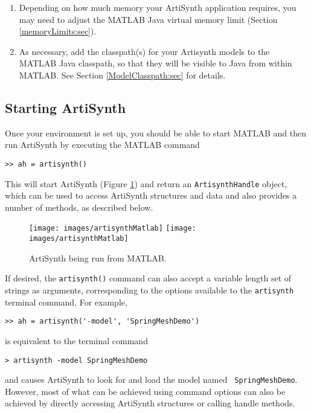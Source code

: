\documentclass{article}
\begin{document}
\begin{enumerate}
\item Depending on how much memory your ArtiSynth application requires,
you may need to adjust the MATLAB Java virtual memory limit (Section
\ref{memoryLimits:sec}).

\item As necessary, add the classpath(s) for your Artisynth models to
the MATLAB Java classpath, so that they will be visible to Java from
within MATLAB. See Section \ref{ModelClasspath:sec} for details.

\end{enumerate}

\subsection{Starting ArtiSynth} 

Once your environment is set up, you should be able to start MATLAB
and then run ArtiSynth by executing the MATLAB command
%
\begin{lstlisting}[]
  >> ah = artisynth()
\end{lstlisting}
%
This will start ArtiSynth (Figure \ref{artisynthMatlab:fig}) and
return an {\tt ArtisynthHandle} object, which can be used to access
ArtiSynth structures and data and also provides a number of methods,
as described below.

\begin{figure}[t]
\begin{center}
\iflatexml
 \texttt{[image: images/artisynthMatlab]}
\else
 \texttt{[image: images/artisynthMatlab]}
\fi
\end{center}
\caption{ArtiSynth being run from MATLAB.}
\label{artisynthMatlab:fig}
\end{figure}

If desired, the {\tt artisynth()} command can also accept a variable
length set of strings as arguments, corresponding to the
options available to the {\tt artisynth} terminal command.  For
example,
%
\begin{lstlisting}[]
  >> ah = artisynth('-model', 'SpringMeshDemo')
\end{lstlisting}
%
is equivalent to the terminal command
%
\begin{lstlisting}[]
  > artisynth -model SpringMeshDemo
\end{lstlisting}
%
and causes ArtiSynth to look for and load the model named {\tt
SpringMeshDemo}. However, most of what can be achieved using command
options can also be achieved by directly accessing ArtiSynth
structures or calling handle methods.
\end{document}

